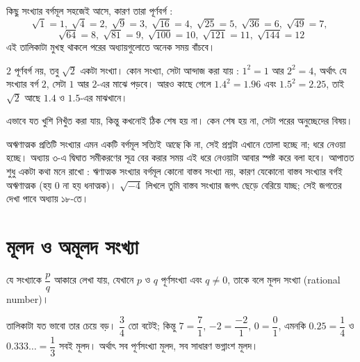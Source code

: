 \documentclass[11pt]{article}
\begin{document}
\noindent
কিছু সংখ্যার বর্গমূল সহজেই আসে, কারণ তারা পূর্ণবর্গ :
\[
  \sqrt{1}=1, \; \sqrt{4}=2, \; \sqrt{9}=3, \; \sqrt{16}=4, \; \sqrt{25}=5, \; \sqrt{36}=6, \; \sqrt{49}=7, \;
  \]\[ \sqrt{64}=8, \; \sqrt{81}=9, \; \sqrt{100}=10, \; 
\sqrt{121}=11, \; \sqrt{144}=12 
\]
এই তালিকাটা মুখস্থ থাকলে পরের অধ্যায়গুলোতে অনেক সময় বাঁচবে।

\begin{idea}[পূর্ণবর্গ না হলেও বর্গমূল থাকে]
$2$ পূর্ণবর্গ নয়, তবু $\sqrt{2}$ একটা সংখ্যা। কোন সংখ্যা, সেটা আন্দাজ করা যায় :
$1^2 = 1$ আর $2^2 = 4$, অর্থাৎ যে সংখ্যার বর্গ $2$, সেটা $1$ আর $2$-এর মাঝে
পড়বে। আরও কাছে গেলে $1.4^2 = 1.96$ এবং $1.5^2 = 2.25$, তাই $\sqrt{2}$ আছে
$1.4$ ও $1.5$-এর মাঝখানে।

এভাবে যত খুশি নিখুঁত করা যায়, কিন্তু কখনোই ঠিক শেষ হয় না। কেন শেষ হয় না,
সেটা পরের অনুচ্ছেদের বিষয়।
\end{idea}

\begin{remark}
অঋণাত্মক প্রতিটি সংখ্যার এমন একটি বর্গমূল সত্যিই \emph{আছে} কি না, সেই
প্রশ্নটা এখানে তোলা হচ্ছে না; ধরে নেওয়া হচ্ছে। অধ্যায় ৩-এ দ্বিঘাত
সমীকরণের সূত্র বের করার সময় এই ধরে নেওয়াটা আবার স্পষ্ট করে বলা হবে। আপাতত
শুধু একটা কথা মনে রাখো : ঋণাত্মক সংখ্যার বর্গমূল কোনো বাস্তব সংখ্যা নয়, কারণ
যেকোনো বাস্তব সংখ্যার বর্গই অঋণাত্মক (হয় 0 না হয় ধনাত্মক)। $\sqrt{-4}$ লিখলে তুমি বাস্তব সংখ্যার
জগৎ ছেড়ে বেরিয়ে যাচ্ছ; সেই জগতের দেখা পাবে অধ্যায় ১৮-তে।
\end{remark}

\section{মূলদ ও অমূলদ সংখ্যা}

\begin{idea}[মূলদ সংখ্যা মানে ভগ্নাংশে লেখা যায়]
যে সংখ্যাকে $\dfrac{p}{q}$ আকারে লেখা যায়, যেখানে $p$ ও $q$ পূর্ণসংখ্যা এবং
$q \neq 0$, তাকে বলে মূলদ সংখ্যা (rational number)।

তালিকাটা যত ভাবো তার চেয়ে বড়। $\dfrac{3}{4}$ তো বটেই; কিন্তু $7 = \dfrac{7}{1}$,
$-2 = \dfrac{-2}{1}$, $0 = \dfrac{0}{1}$, এমনকি $0.25 = \dfrac{1}{4}$ ও
$0.333\ldots = \dfrac{1}{3}$ সবই মূলদ। অর্থাৎ সব পূর্ণসংখ্যা মূলদ, সব সাধারণ
ভগ্নাংশ মূলদ।
\end{idea}
\end{document}

